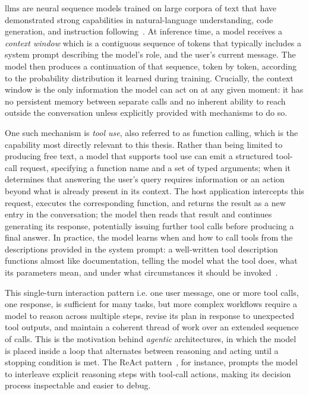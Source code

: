 \documentclass[
  numbers=noenddot,
  english,
  a4paper,
  twoside,
  bibliography=totoc,
  headsepline,
  cleardoublepage=empty,
  parskip=half,
  draft=false
]{scrbook}
\theoremstyle{break}
\renewcommand{\_}{\textunderscore\allowbreak}
\begin{document}
\Glspl{llm} are neural sequence models trained on large corpora of text that have demonstrated
strong capabilities in natural-language understanding, code generation, and instruction
following~\cite{brown2020gpt3}.
At inference time, a model receives a \emph{context window} which is a contiguous sequence of
tokens that typically includes a system prompt describing the model's role, and the user's current message.
The model then produces a continuation of that sequence, token by token, according to the
probability distribution it learned during training.
Crucially, the context window is the only information the model can act on at any given moment:
it has no persistent memory between separate calls and no inherent ability to reach outside
the conversation unless explicitly provided with mechanisms to do so.

One such mechanism is \emph{tool use}, also referred to as function calling, which is the
capability most directly relevant to this thesis.
Rather than being limited to producing free text, a model that supports tool use can emit a
structured tool-call request, specifying a function name and a set of typed arguments; 
when it determines that answering the user's query requires information or an action beyond
what is already present in its context.
The host application intercepts this request, executes the corresponding function, and returns
the result as a new entry in the conversation; the model then reads that result and continues
generating its response, potentially issuing further tool calls before producing a final answer.
In practice, the model learns when and how to call tools from the descriptions provided in
the system prompt: a well-written tool description functions almost like documentation, telling
the model what the tool does, what its parameters mean, and under what circumstances it
should be invoked~\cite{anthropic2024tool}.

This single-turn interaction pattern i.e. one user message, one or more tool calls, one
response, is sufficient for many tasks, but more complex workflows require a model to
reason across multiple steps, revise its plan in response to unexpected tool outputs, and
maintain a coherent thread of work over an extended sequence of calls.
This is the motivation behind \emph{agentic} architectures, in which the model is placed
inside a loop that alternates between reasoning and acting until a stopping condition is met.
The ReAct pattern~\cite{yao2023react}, for instance, prompts the model to interleave explicit
reasoning steps with tool-call actions, making its decision process inspectable and easier to
debug.
\end{document}
